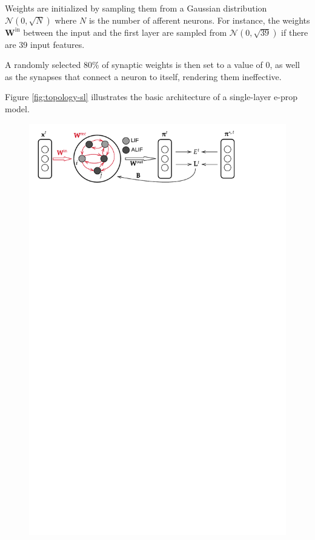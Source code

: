         Weights are initialized by sampling them from a Gaussian distribution $\mathcal{N}\left(0, \sqrt{N}\right)$ where $N$ is the number of afferent neurons.
        For instance, the weights $\mathbf{W}^\text{in}$ between the input and the first layer are sampled from $\mathcal{N}\left(0, \sqrt{39}\right)$ if there are 39 input features.

        A randomly selected 80\% of synaptic weights is then set to a value of 0, as well as the synapses that connect a neuron to itself, rendering them ineffective.

        Figure \ref{fig:topology-sl} illustrates the basic architecture of a single-layer e-prop model.
        \begin{figure}[!ht]
            \myfloatalign
            \includegraphics[trim=0 25cm 0 0, clip, width=\linewidth]{gfx/Singlelayer}

\end{figure}
